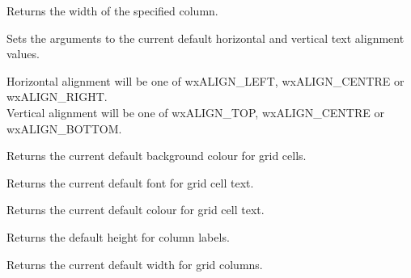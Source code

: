 \label{wxgridgetcolsize}


Returns the width of the specified column.



\label{wxgridgetdefaultcellalignment}


Sets the arguments to the current default horizontal and vertical text alignment
values.

Horizontal alignment will be one of wxALIGN\_LEFT, wxALIGN\_CENTRE or wxALIGN\_RIGHT. \\
Vertical alignment will be one of wxALIGN\_TOP, wxALIGN\_CENTRE or wxALIGN\_BOTTOM.



\label{wxgridgetdefaultcellbackgroundcolour}


Returns the current default background colour for grid cells.



\label{wxgridgetdefaultcellfont}


Returns the current default font for grid cell text.



\label{wxgridgetdefaultcelltextcolour}


Returns the current default colour for grid cell text.



\label{wxgridgetdefaultcollabelsize}


Returns the default height for column labels.



\label{wxgridgetdefaultcolsize}


Returns the current default width for grid columns.



